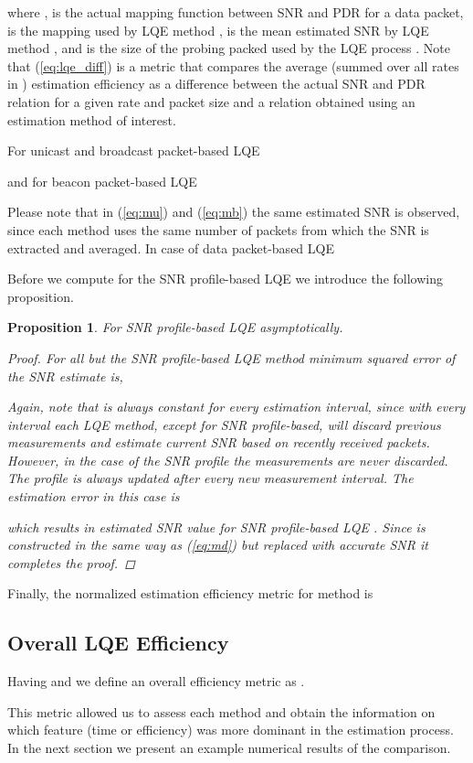 \documentclass[11pt,draftclsnofoot,journal,onecolumn]{IEEEtran}
\newtheorem{proposition}{Proposition}
\begin{document}
where  ,  is the actual mapping function between SNR and PDR for a data packet,  is the mapping used by LQE method ,  is the mean estimated SNR by LQE method , and  is the size of the probing packed used by the LQE process . Note that (\ref{eq:lqe_diff}) is a metric that compares the average (summed over all rates in ) estimation efficiency as a difference between the actual SNR and PDR relation for a given rate and packet size and a relation obtained using an estimation method of interest.

For unicast and broadcast packet-based LQE

and for beacon packet-based LQE

Please note that in (\ref{eq:mu}) and (\ref{eq:mb}) the same estimated SNR  is observed, since each method uses the same number of packets from which the SNR  is extracted and averaged. In case of data packet-based LQE

Before we compute  for the SNR profile-based LQE we introduce the following proposition.
\begin{proposition}
For SNR profile-based LQE  asymptotically.
\begin{proof}
For all but the SNR profile-based LQE method minimum squared error of the SNR estimate is,

Again, note that  is always constant for every estimation interval, since with every interval each LQE method, except for SNR profile-based, will discard previous measurements and estimate current SNR based on recently received packets. However, in the case of the SNR profile the measurements are never discarded. The profile is always updated after every new measurement interval. The estimation error in this case is

which results in estimated SNR value for SNR profile-based LQE . Since  is constructed in the same way as (\ref{eq:md}) but replaced with accurate SNR it completes the proof. \end{proof} \label{lem:1} \end{proposition}

Finally, the normalized estimation efficiency metric for method  is


\subsection{Overall LQE Efficiency}

Having  and  we define an overall efficiency metric as .

This metric allowed us to assess each method and obtain the information on which feature (time or efficiency) was more dominant in the estimation process. In the next section we present an example numerical results of the comparison.
\end{document}
